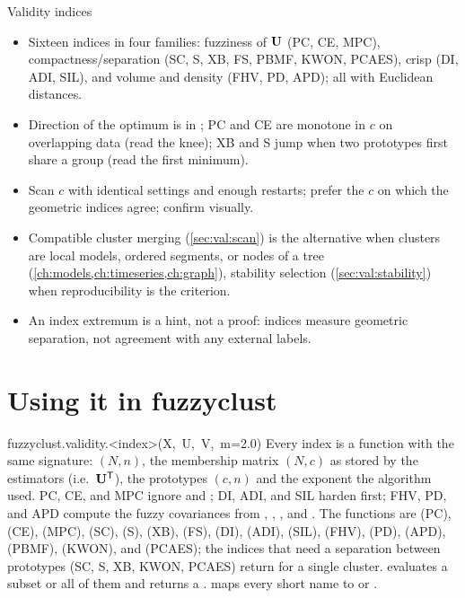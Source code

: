 \begin{summarybox}{Validity indices}
\begin{itemize}
  \item Sixteen indices in four families: fuzziness of $\mathbf{U}$ (PC, CE, MPC), compactness/separation (SC, S, XB, FS, PBMF, KWON, PCAES), crisp (DI, ADI, SIL), and volume and density (FHV, PD, APD); all with Euclidean distances.
  \item Direction of the optimum is in ; PC and CE are monotone in $c$ on overlapping data (read the knee); XB and S jump when two prototypes first share a group (read the first minimum).
  \item Scan $c$ with identical settings and enough restarts; prefer the $c$ on which the geometric indices agree; confirm visually.
  \item Compatible cluster merging (\cref{sec:val:scan}) is the alternative when clusters are local models, ordered segments, or nodes of a tree (\cref{ch:models,ch:timeseries,ch:graph}), stability selection (\cref{sec:val:stability}) when reproducibility is the criterion.
  \item An index extremum is a hint, not a proof: indices measure geometric separation, not agreement with any external labels.
\end{itemize}
\end{summarybox}

\section{Using it in fuzzyclust}\label{sec:val:api}

\begin{apibox}{fuzzyclust.validity.<index>(\allowbreak X,\allowbreak\ U,\allowbreak\ V,\allowbreak\ m=2.0)}
Every index is a function with the same signature:  $(N,n)$,  the membership matrix $(N,c)$ as stored by the estimators (i.e.\ $\mathbf{U}^{\mathsf{T}}$),  the prototypes $(c,n)$ and  the exponent the algorithm used. PC, CE, and MPC ignore  and ; DI, ADI, and SIL harden  first; FHV, PD, and APD compute the fuzzy covariances from , , , and . The functions are  (PC),  (CE),  (MPC),  (SC),  (S),  (XB),  (FS),  (DI),  (ADI),  (SIL),  (FHV),  (PD),  (APD),  (PBMF),  (KWON), and  (PCAES); the indices that need a separation between prototypes (SC, S, XB, KWON, PCAES) return  for a single cluster.  evaluates a subset or all of them and returns a .  maps every short name to  or .
\end{apibox}

